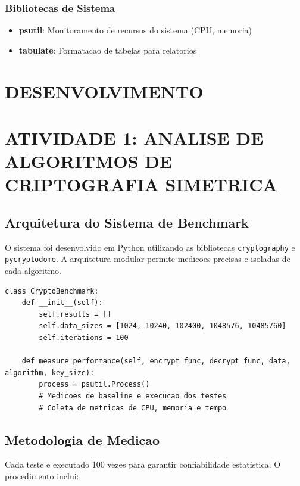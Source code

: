 \documentclass[12pt,a4paper,oneside]{article}
\begin{document}
\subsubsection{Bibliotecas de Sistema}

\begin{itemize}
    \item \textbf{psutil}: Monitoramento de recursos do sistema (CPU, memoria)
    \item \textbf{tabulate}: Formatacao de tabelas para relatorios
\end{itemize}

\section{DESENVOLVIMENTO}

\section{ATIVIDADE 1: ANALISE DE ALGORITMOS DE CRIPTOGRAFIA SIMETRICA}

\subsection{Arquitetura do Sistema de Benchmark}

O sistema foi desenvolvido em Python utilizando as bibliotecas \texttt{cryptography} e \texttt{pycryptodome}. A arquitetura modular permite medicoes precisas e isoladas de cada algoritmo.

\begin{lstlisting}[caption=Estrutura principal da classe CryptoBenchmark]
class CryptoBenchmark:
    def __init__(self):
        self.results = []
        self.data_sizes = [1024, 10240, 102400, 1048576, 10485760]
        self.iterations = 100
    
    def measure_performance(self, encrypt_func, decrypt_func, data, algorithm, key_size):
        process = psutil.Process()
        # Medicoes de baseline e execucao dos testes
        # Coleta de metricas de CPU, memoria e tempo
\end{lstlisting}

\subsection{Metodologia de Medicao}

Cada teste e executado 100 vezes para garantir confiabilidade estatistica. O procedimento inclui:
\end{document}
